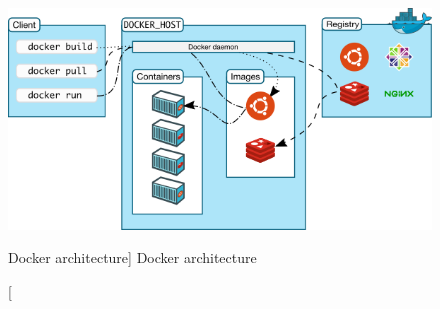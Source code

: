 \begin{figure}[htb]\centering
  \includegraphics[width=1\textwidth]{images/dockerarchitecture.png}
  \caption
    [Docker architecture]
    {Docker architecture \cite{dockerdocs}}
  \label{fig:docker-architecture}
\end{figure}

